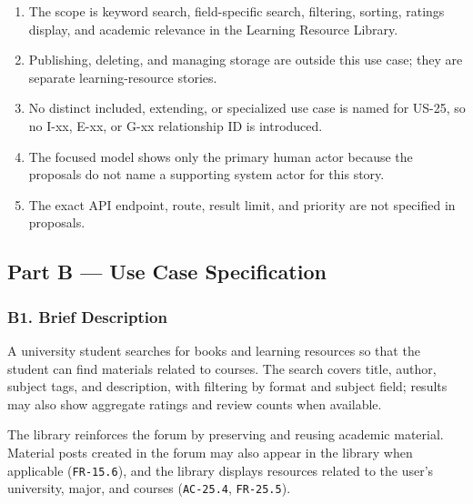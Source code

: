 \documentclass[12pt]{article}
\begin{document}
\begin{enumerate}
\item The scope is keyword search, field-specific search, filtering, sorting, ratings display, and academic relevance in the Learning Resource Library.
\item Publishing, deleting, and managing storage are outside this use case; they are separate learning-resource stories.
\item No distinct included, extending, or specialized use case is named for US-25, so no I-xx, E-xx, or G-xx relationship ID is introduced.
\item The focused model shows only the primary human actor because the proposals do not name a supporting system actor for this story.
\item The exact API endpoint, route, result limit, and priority are not specified in proposals.
\end{enumerate}
\par\medskip

\hypertarget{sec:part-b-use-case-specification}{}
\subsection*{Part B --- Use Case Specification}
\par\medskip

\hypertarget{sec:b1-brief-description}{}
\subsubsection*{B1. Brief Description}
\par\medskip

A university student searches for books and learning resources so that the student can find materials related to courses. The search covers title, author, subject tags, and description, with filtering by format and subject field; results may also show aggregate ratings and review counts when available.
\par\medskip

The library reinforces the forum by preserving and reusing academic material. Material posts created in the forum may also appear in the library when applicable (\texttt{FR-15.6}), and the library displays resources related to the user's university, major, and courses (\texttt{AC-25.4}, \texttt{FR-25.5}).
\par\medskip
\end{document}

